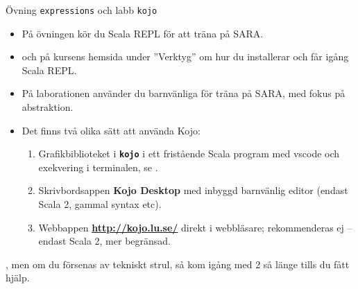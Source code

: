
\begin{Slide}{Övning \texttt{expressions} och labb \texttt{kojo}}
\label{w01:kojo-slide}
\begin{itemize}
  \item På övningen kör du Scala REPL för att träna på SARA.
  \item[]  och på kursens hemsida under ''Verktyg'' om hur du installerar och får igång Scala REPL.
  \item På laborationen använder du barnvänliga  för träna på SARA, med fokus på abstraktion.
  \item Det finns två olika sätt att använda Kojo:
  \begin{enumerate}
  \item Grafikbiblioteket i \textbf{\texttt{kojo}} i ett fristående Scala program med vscode och exekvering i terminalen, se  .
  \item Skrivbordsappen \textbf{Kojo Desktop} med inbyggd barnvänlig editor (endast Scala 2, gammal syntax etc).
  \item Webbappen \textbf{\url{http://kojo.lu.se/}} direkt i webbläsare; rekommenderas ej -- endast Scala 2, mer begränsad.
  \end{enumerate}
\end{itemize}  
, men om du försenas av tekniskt strul, så kom igång med 2 så länge tills du fått hjälp.
\end{Slide}

